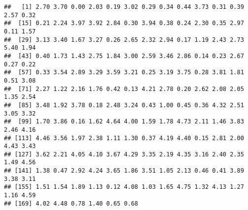 \documentclass[]{article}
\newenvironment{Shaded}{\begin{snugshade}}{\end{snugshade}}
\newcommand{\KeywordTok}[1]{\textcolor[rgb]{0.13,0.29,0.53}{\textbf{#1}}}
\newcommand{\DataTypeTok}[1]{\textcolor[rgb]{0.13,0.29,0.53}{#1}}
\newcommand{\DecValTok}[1]{\textcolor[rgb]{0.00,0.00,0.81}{#1}}
\newcommand{\StringTok}[1]{\textcolor[rgb]{0.31,0.60,0.02}{#1}}
\newcommand{\OperatorTok}[1]{\textcolor[rgb]{0.81,0.36,0.00}{\textbf{#1}}}
\newcommand{\NormalTok}[1]{#1}
\begin{document}
\begin{verbatim}
##   [1] 2.70 3.70 0.00 2.03 0.19 3.02 0.29 0.34 0.44 3.73 0.31 0.39 2.57 0.32
##  [15] 0.21 2.24 3.97 3.92 2.84 0.30 3.94 0.38 0.24 2.30 0.35 2.97 0.11 1.57
##  [29] 3.13 3.40 1.67 3.27 0.26 2.65 2.32 2.94 0.17 1.19 2.43 2.73 5.40 1.94
##  [43] 0.40 1.73 1.43 2.75 1.84 3.00 2.59 3.46 2.86 0.14 0.23 2.67 0.27 0.22
##  [57] 0.33 3.54 2.89 3.29 3.59 3.21 0.25 3.19 3.75 0.28 3.81 1.81 0.51 3.08
##  [71] 2.27 1.22 2.16 1.76 0.42 0.13 4.21 2.78 0.20 2.62 2.08 2.05 1.35 2.54
##  [85] 3.48 1.92 3.78 0.18 2.48 3.24 0.43 1.00 0.45 0.36 4.32 2.51 3.05 3.32
##  [99] 1.70 3.86 0.16 1.62 4.64 4.00 1.59 1.78 4.73 2.11 1.46 3.83 2.46 4.16
## [113] 4.46 3.56 1.97 2.38 1.11 1.30 0.37 4.19 4.40 0.15 2.81 2.00 4.43 3.43
## [127] 3.62 2.21 4.05 4.10 3.67 4.29 3.35 2.19 4.35 3.16 2.40 2.35 1.49 4.56
## [141] 1.38 0.47 2.92 4.24 3.65 1.86 3.51 1.05 2.13 0.46 0.41 3.89 3.38 3.11
## [155] 1.51 1.54 1.89 1.13 0.12 4.08 1.03 1.65 4.75 1.32 4.13 1.27 1.16 4.59
## [169] 4.02 4.48 0.78 1.40 0.65 0.68
\end{verbatim}

\begin{Shaded}
\end{Shaded}
\end{document}
